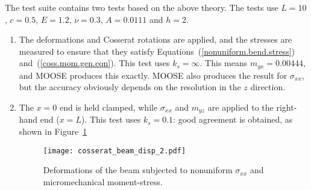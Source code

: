 \documentclass[]{scrreprt}
\begin{document}
The test suite contains two tests based on the above theory.  The
tests use $L=10$, $c=0.5$, $E=1.2$, $\nu=0.3$, $A=0.0111$ and $h=2$.
\begin{enumerate}
\item The deformations and Cosserat rotations are applied, and the
  stresses are measured to ensure that they satisfy
  Equations~(\ref{nonuniform.bend.stress})
  and~(\ref{coss.mom.gen.eqn}).  This test uses $k_{s}=\infty$.  This
  means $m_{yx}=0.00444$, and MOOSE produces this exactly.  MOOSE also
  produces the result for $\sigma_{xx}$, but the accuracy obviously
  depends on the resolution in the $z$ direction.

\item The $x=0$ end is held clamped, while $\sigma_{xx}$ and $m_{yz}$
  are applied to the right-hand end ($x=L$).  This test uses
  $k_{s}=0.1$: good
  agreement is obtained, as shown in Figure~\ref{beam2.fig}
\begin{figure}[htb]
\begin{center}
\texttt{[image: cosserat\_beam\_disp\_2.pdf]}
\caption{Deformations of the beam subjected to nonuniform
  $\sigma_{xx}$ and micromechanical moment-stress.}
\label{beam2.fig}
\end{center}
\end{figure}

\end{enumerate}
\end{document}
